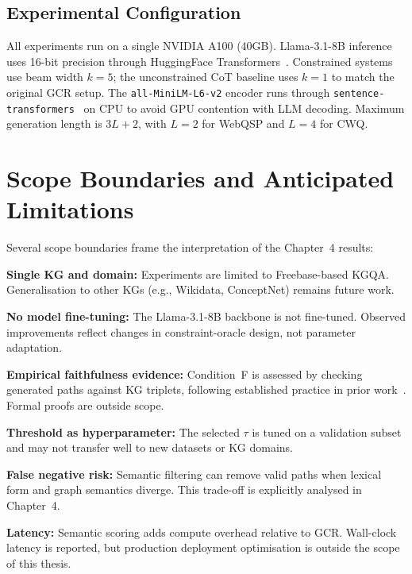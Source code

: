 \subsection{Experimental Configuration}

All experiments run on a single NVIDIA A100 (40GB). Llama-3.1-8B inference uses 16-bit precision through HuggingFace Transformers~\citep{wolf2020transformers}. Constrained systems use beam width $k=5$; the unconstrained CoT baseline uses $k=1$ to match the original GCR setup. The \texttt{all-MiniLM-L6-v2} encoder runs through \texttt{sentence-transformers}~\citep{reimers2019sbert} on CPU to avoid GPU contention with LLM decoding. Maximum generation length is $3L+2$, with $L=2$ for WebQSP and $L=4$ for CWQ.

\section{Scope Boundaries and Anticipated Limitations}
\label{sec:ch3limitations}

Several scope boundaries frame the interpretation of the Chapter~4 results:

\textbf{Single KG and domain:} Experiments are limited to Freebase-based KGQA. Generalisation to other KGs (e.g., Wikidata, ConceptNet) remains future work.

\textbf{No model fine-tuning:} The Llama-3.1-8B backbone is not fine-tuned. Observed improvements reflect changes in constraint-oracle design, not parameter adaptation.

\textbf{Empirical faithfulness evidence:} Condition~F is assessed by checking generated paths against KG triplets, following established practice in prior work~\citep{luo2025-graph-constrained-reasoning, li2024-decoding-on-graphs}. Formal proofs are outside scope.

\textbf{Threshold as hyperparameter:} The selected $\tau$ is tuned on a validation subset and may not transfer well to new datasets or KG domains.

\textbf{False negative risk:} Semantic filtering can remove valid paths when lexical form and graph semantics diverge. This trade-off is explicitly analysed in Chapter~4.

\textbf{Latency:} Semantic scoring adds compute overhead relative to GCR. Wall-clock latency is reported, but production deployment optimisation is outside the scope of this thesis.
